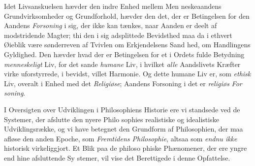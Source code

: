 Idet Livsanskuelsen hævder den indre Enhed mellem Men\-%
neskeaandens Grundvirksomheder og Grundforhold, hævder den
det, der er Betingelsen for den Aandens \emph{Forsoning} i sig,
der ikke kan tænkes, naar Aanden er deelt af modstridende
Magter; thi den i sig adsplittede Bevidsthed maa da i ethvert
Øieblik være sønderreven af Tvivlen om Erkjendelsens Sand\-%
hed, om Handlingens Gyldighed. Den hævder hvad der er
Betingelsen for et i Ordets fulde Betydning \emph{menneskeligt}
Liv, for det sande \emph{humane} Liv, i hvilket \emph{alle} Aandslivets
Kræfter virke uforstyrrede, i bevidst, villet Harmonie. Og
dette humane Liv er, som \emph{ethisk} Liv, overalt i Enhed med
det \emph{Religiøse}; Aandens Forsoning i det er \emph{religiøs For\-%
soning}.

\divrule

I Oversigten over Udviklingen i Philosophiens Historie ere
vi standsede ved de Systemer, der afslutte den nyere Philo\-%
sophies realistiske og idealistiske Udviklingsrække, og vi have
betegnet den Grundform af Philosophien, der maa afløse den
anden Epoche, som \emph{Fremtidens Philosophie}, altsaa som
\emph{endnu ikke} historisk virkeliggjort. Et Blik paa de philoso\-%
phiske Phænomener, der ere yngre end hine afsluttende Sy\-%
stemer, vil vise det Berettigede i denne Opfattelse.

